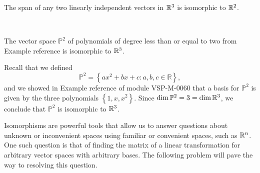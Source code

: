 \documentclass{ximera}
\begin{document}
\begin{example}
The span of any two linearly independent vectors in $\mathbb{R}^3$ is isomorphic to $\mathbb{R}^2$. %


\begin{image}
~~~~~~~~~~~~~
  \label{fig:planeisoplane} 
  \end{image}

\end{example}

\begin{example}
The vector space $\mathbb{P}^2$ of polynomials of degree less than or equal to two from Example {\color{red} reference} is isomorphic to $\mathbb{R}^3$.
\end{example}

\begin{explanation}
Recall that we defined $$\mathbb{P}^2=\left\{ax^2+bx+c : a,b,c \in \mathbb{R} \right\},$$ and we showed in Example {\color{red} reference} of module VSP-M-0060 that a basis for $\mathbb{P}^2$ is given by the three polynomials $\left\{1,x,x^2\right\}$.  Since $\textnormal{dim}\,\mathbb{P}^2=3=\textnormal{dim}\,\mathbb{R}^3$, we conclude that $\mathbb{P}^2$ is isomorphic to $\mathbb{R}^3$.
\end{explanation}

Isomorphisms are powerful tools that allow us to answer questions about unknown or inconvenient spaces using familiar or convenient spaces, such as $\mathbb{R}^n$.  One such question is that of finding the matrix of a linear transformation for arbitrary vector spaces with arbitrary bases.  The following problem will pave the way to resolving this question. 
\end{document}
